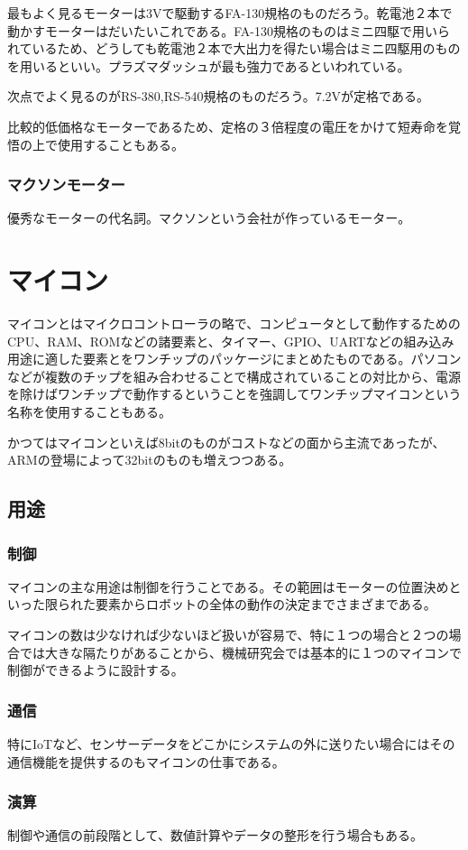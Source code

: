 \documentclass[a4paper,titlepage,here]{ujarticle}
\begin{document}
最もよく見るモーターは3Vで駆動するFA-130規格のものだろう。乾電池２本で動かすモーターはだいたいこれである。FA-130規格のものはミニ四駆で用いられているため、どうしても乾電池２本で大出力を得たい場合はミニ四駆用のものを用いるといい。プラズマダッシュが最も強力であるといわれている。

次点でよく見るのがRS-380,RS-540規格のものだろう。7.2Vが定格である。

比較的低価格なモーターであるため、定格の３倍程度の電圧をかけて短寿命を覚悟の上で使用することもある。
\subsubsection{マクソンモーター}
優秀なモーターの代名詞。マクソンという会社が作っているモーター。
\section{マイコン}
マイコンとはマイクロコントローラの略で、コンピュータとして動作するためのCPU、RAM、ROMなどの諸要素と、タイマー、GPIO、UARTなどの組み込み用途に適した要素とをワンチップのパッケージにまとめたものである。パソコンなどが複数のチップを組み合わせることで構成されていることの対比から、電源を除けばワンチップで動作するということを強調してワンチップマイコンという名称を使用することもある。

かつてはマイコンといえば8bitのものがコストなどの面から主流であったが、ARMの登場によって32bitのものも増えつつある。

\subsection{用途}
\subsubsection{制御}
マイコンの主な用途は制御を行うことである。その範囲はモーターの位置決めといった限られた要素からロボットの全体の動作の決定までさまざまである。

マイコンの数は少なければ少ないほど扱いが容易で、特に１つの場合と２つの場合では大きな隔たりがあることから、機械研究会では基本的に１つのマイコンで制御ができるように設計する。
\subsubsection{通信}
特にIoTなど、センサーデータをどこかにシステムの外に送りたい場合にはその通信機能を提供するのもマイコンの仕事である。
\subsubsection{演算}
制御や通信の前段階として、数値計算やデータの整形を行う場合もある。
\end{document}
